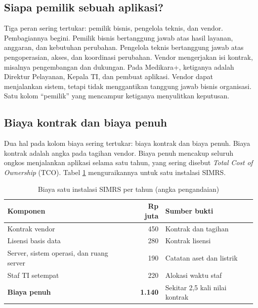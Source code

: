 \subsection*{Siapa pemilik sebuah aplikasi?}

Tiga peran sering tertukar: pemilik bisnis, pengelola teknis, dan vendor. Pembagiannya begini.
Pemilik bisnis bertanggung jawab atas hasil layanan, anggaran, dan kebutuhan perubahan. Pengelola
teknis bertanggung jawab atas pengoperasian, akses, dan koordinasi perubahan. Vendor mengerjakan isi
kontrak, misalnya pengembangan dan dukungan. Pada Medikara+, ketiganya adalah Direktur Pelayanan,
Kepala TI, dan pembuat aplikasi. Vendor dapat menjalankan sistem, tetapi tidak menggantikan tanggung
jawab bisnis organisasi. Satu kolom ``pemilik'' yang mencampur ketiganya menyulitkan keputusan.

\subsection*{Biaya kontrak dan biaya penuh}

Dua hal pada kolom biaya sering tertukar: biaya kontrak dan biaya penuh. Biaya kontrak adalah
angka pada tagihan vendor. Biaya penuh mencakup seluruh ongkos menjalankan aplikasi selama satu
tahun, yang sering disebut \textit{Total Cost of Ownership} (TCO). Tabel
\ref{tab:ch07-biaya-penuh} menguraikannya untuk satu instalasi SIMRS.

\begin{table}[!htb]
  \centering
  \caption{Biaya satu instalasi SIMRS per tahun (angka pengandaian)}
  \label{tab:ch07-biaya-penuh}
  \small
  \begin{tabularx}{\textwidth}{>{\raggedright\arraybackslash}Xr>{\raggedright\arraybackslash}p{4.3cm}}
    \hline
    \textbf{Komponen} & \textbf{Rp juta} & \textbf{Sumber bukti} \\
    \hline
    Kontrak vendor & 450 & Kontrak dan tagihan \\
    \hline
    Lisensi basis data & 280 & Kontrak lisensi \\
    \hline
    Server, sistem operasi, dan ruang server & 190 & Catatan aset dan listrik \\
    \hline
    Staf TI setempat & 220 & Alokasi waktu staf \\
    \hline
    \textbf{Biaya penuh} & \textbf{1.140} & Sekitar 2,5 kali nilai kontrak \\
    \hline
  \end{tabularx}
\end{table}

